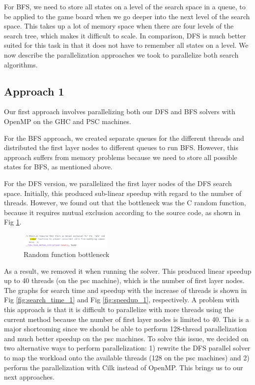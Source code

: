 For BFS, we need to store all states on a level of the search space in a queue, to be applied to the game board when we go deeper into the next level of the search space. This takes up a lot of memory space when there are four levels of the search tree, which makes it difficult to scale. In comparison, DFS is much better suited for this task in that it does not have to remember all states on a level. We now describe the parallelization approaches we took to parallelize both search algorithms.

\subsection{Approach 1}

Our first approach involves parallelizing both our DFS and BFS solvers with OpenMP on the GHC and PSC machines.

For the BFS approach, we created separate queues for the different threads and distributed the first layer nodes to different queues to run BFS. However, this approach suffers from memory problems because we need to store all possible states for BFS, as mentioned above.

For the DFS version, we parallelized the first layer nodes of the DFS search space. Initially, this produced sub-linear speedup with regard to the number of threads. However, we found out that the bottleneck was the C random function, because it requires mutual exclusion according to the source code, as shown in Fig \ref{fig:random_function}.

\begin{figure}[h]
	\centering
	\includegraphics[width=0.4\textwidth]{random_function.png}
	\vspace{-1em}
	\caption{Random function bottleneck}
	\label{fig:random_function}
\end{figure}

As a result, we removed it when running the solver. This produced linear speedup up to 40 threads (on the psc machine), which is the number of first layer nodes. The graphs for search time and speedup with the increase of threads is shown in Fig \ref{fig:search_time_1} and Fig \ref{fig:speedup_1}, respectively. A problem with this approach is that it is difficult to parallelize with more threads using the current method because the number of first layer nodes is limited to 40. This is a major shortcoming since we should be able to perform 128-thread parallelization and much better speedup on the psc machines. To solve this issue, we decided on two alternative ways to perform parallelization: 1) rewrite the DFS parallel solver to map the workload onto the available threads (128 on the psc machines) and 2) perform the parallelization with Cilk instead of OpenMP. This brings us to our next approaches.

